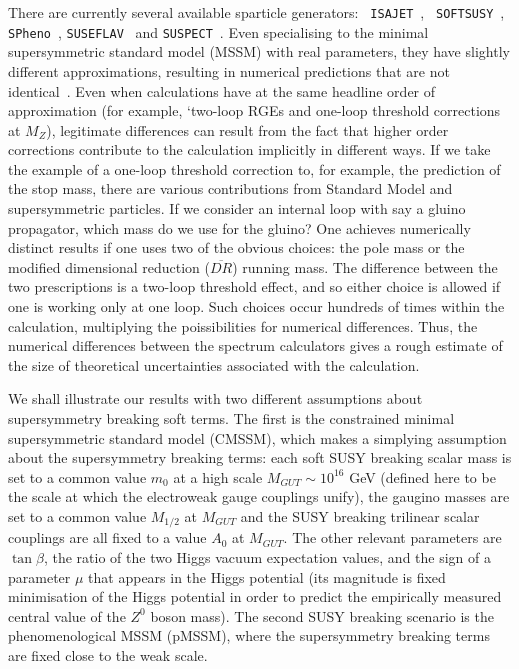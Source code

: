 \documentclass[final,3p,times,pdflatex]{elsarticle}
\begin{document}
There are currently several available sparticle generators: {\tt
  ISAJET}~\cite{Paige:2003mg}, {\tt 
  SOFTSUSY}~\cite{Allanach:2001kg,Allanach:2009bv,Allanach:2011de,Allanach:2013kza}, 
{\tt SPheno}~\cite{Porod:2003um},
{\tt SUSEFLAV}~\cite{Chowdhury:2011zr} and
{\tt SUSPECT}~\cite{Djouadi:2002ze}. Even specialising to the minimal
supersymmetric standard model (MSSM) with real parameters, 
they have slightly different
approximations, resulting in numerical predictions that are not
identical~\cite{Allanach:2003jw,Allanach:2004rh,Belanger:2005jk}. 
Even when calculations have at the same headline order of approximation (for
example, `two-loop RGEs and one-loop threshold corrections at $M_Z$),
legitimate differences can result from the fact that higher order corrections
contribute to the calculation implicitly in different ways. 
If we take the example of a one-loop threshold correction to, for example, 
the prediction of the stop mass, there are various contributions from Standard
Model and supersymmetric particles. If we consider an internal loop with
say a gluino propagator, which mass do we use for the gluino? One achieves
numerically distinct results if one uses two of the obvious choices: the
pole mass or the modified dimensional reduction ($\overline{DR}$) running
mass. The difference between the two prescriptions is a two-loop threshold
effect, and so either choice is allowed if one is working only at one loop.
Such choices occur hundreds of times within the calculation, multiplying the
poissibilities for numerical differences. Thus, the numerical differences
between the spectrum calculators gives a rough estimate of the size of
theoretical uncertainties associated with the calculation. 

We shall illustrate our results with two different assumptions about
supersymmetry breaking soft terms. The first is the
constrained minimal supersymmetric standard model (CMSSM), which makes a
simplying 
assumption about the supersymmetry breaking terms: each soft SUSY breaking
scalar mass is set to a common value $m_0$ at a high scale $M_{GUT}\sim
10^{16}$ GeV (defined
here to be the scale at which the electroweak gauge couplings unify), the
gaugino masses are set to a common value $M_{1/2}$ at $M_{GUT}$ and the 
SUSY breaking trilinear scalar couplings are all fixed to a value $A_0$ at
$M_{GUT}$. The other relevant parameters are $\tan \beta$, the ratio of the
two Higgs vacuum expectation values, and the sign of a parameter $\mu$ that
appears in the Higgs potential (its magnitude is fixed minimisation of the
Higgs potential in order to predict the empirically measured central value of
the $Z^0$ boson mass).
The second SUSY breaking scenario is the phenomenological MSSM (pMSSM), where
the supersymmetry breaking terms are fixed close to the weak scale. 
\end{document}
